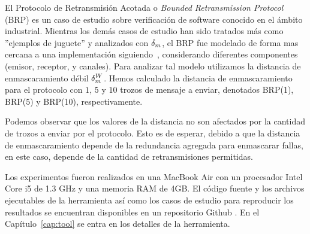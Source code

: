 El Protocolo de Retransmisión Acotada o \textit{Bounded Retransmission Protocol} (BRP) es un caso de estudio sobre verificación de software conocido en el ámbito industrial. Mientras los demás casos de estudio han sido tratados más como ''ejemplos de juguete'' y analizados con $\delta_{m}$, el BRP fue modelado de forma mas cercana a una implementación siguiendo~\cite{GrooteP96}, considerando diferentes componentes (emisor, receptor, y canales). Para analizar tal modelo utilizamos la distancia de enmascaramiento débil $\delta_{m}^W$.
Hemos calculado la distancia de enmascaramiento para el protocolo con $1$, $5$ y $10$ trozos de mensaje a enviar, denotados BRP(1), BRP(5) y BRP(10), respectivamente. 

Podemos observar que los valores de la distancia no son afectados por la cantidad de trozos a enviar por el protocolo. Esto es de esperar, debido a que la distancia de enmascaramiento depende de la redundancia agregada para enmascarar fallas, en este caso, depende de la cantidad de retransmisiones permitidas.

Los experimentos fueron realizados en una MacBook Air con un procesador Intel Core i5 de 1.3 GHz y una memoria RAM de 4GB. El código fuente y los archivos ejecutables de la herramienta así como los casos de estudio para reproducir los resultados se encuentran disponibles en un repositorio Github \cite{MaskD}. En el Capítulo~\ref{cap:tool} se entra en los detalles de la herramienta.